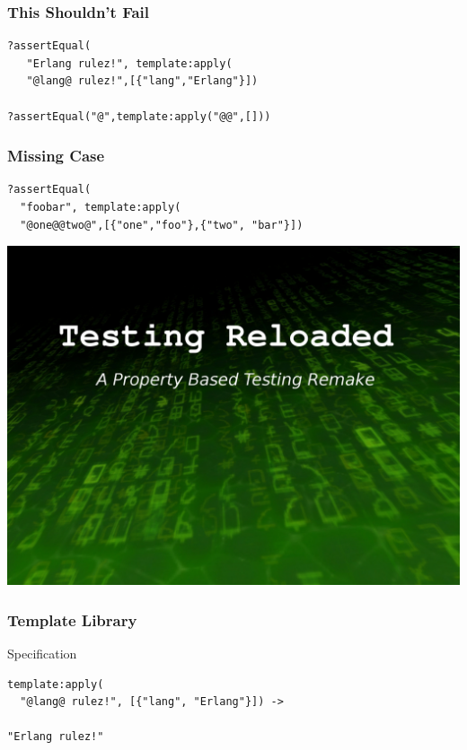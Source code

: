 \documentclass[xcolor=dvipsnames]{beamer}
\begin{document}
\begin{frame}[fragile]
  \frametitle{This Shouldn't Fail}

\begin{verbatim}
?assertEqual(
   "Erlang rulez!", template:apply(
   "@lang@ rulez!",[{"lang","Erlang"}])

?assertEqual("@",template:apply("@@",[]))
\end{verbatim}
\end{frame}

\begin{frame}[fragile]
  \frametitle{Missing Case}
\begin{verbatim}
?assertEqual(
  "foobar", template:apply(
  "@one@@two@",[{"one","foo"},{"two", "bar"}])
\end{verbatim}
\end{frame}

\begin{frame}[plain]
  \includegraphics[width=\textwidth]{images/matrix}
\end{frame}

\begin{frame}[fragile]
  \frametitle{Template Library}

  \begin{block}{Specification}%
\begin{verbatim}
template:apply(
  "@lang@ rulez!", [{"lang", "Erlang"}]) ->

"Erlang rulez!"
\end{verbatim}
  \end{block}
\end{frame}
\end{document}
